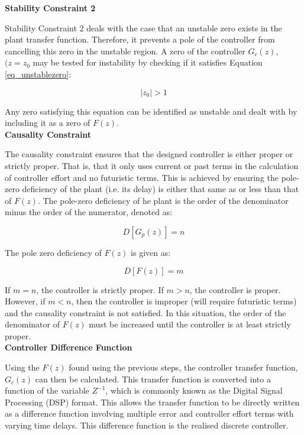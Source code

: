 \textbf{Stability Constraint 2}

Stability Constraint 2 deals with the case that an unstable zero exists in the plant transfer function. Therefore, it prevents a pole of the controller from cancelling this zero in the unstable region. A zero of the controller $G_c(z)$, $(z = z_0$ may be tested for instability by checking if it satisfies Equation \ref{eq_unstablezero}:

\begin{equation}
\label{eq_unstablezero}
|z_0| > 1
\end{equation}

Any zero satisfying this equation can be identified as unstable and dealt with by including it as a zero of $F(z)$.\\

\textbf{Causality Constraint}

The causality constraint ensures that the designed controller is either proper or strictly proper. That is, that it only uses current or past terms in the calculation of controller effort and no futuristic terms. This is achieved by ensuring the pole-zero deficiency of the plant (i.e. its delay) is either that same as or less than that of $F(z)$. The pole-zero deficiency of he plant is the order of the denominator minus the order of the numerator, denoted as:

\begin{equation}
\label{eq_plantdef}
D[ G_p(z) ] = n
\end{equation}

The pole zero deficiency of $F(z)$ is given as:

\begin{equation}
\label{eq_fdef}
D[ F(z) ] = m
\end{equation}

If $m = n$, the controller is strictly proper. If $m > n$, the controller is proper. However, if $m < n$, then the controller is improper (will require futuristic terms) and the causality constraint is not satisfied. In this situation, the order of the denominator of $F(z)$ must be increased until the controller is at least strictly proper.\\

\textbf{Controller Difference Function}

Using the $F(z)$ found using the previous steps, the controller transfer function, $G_c(z)$ can then be calculated. This transfer function is converted into a function of the variable $Z^{-1}$, which is commonly known as the Digital Signal Processing (DSP) format. This allows the transfer function to be directly written as a difference function involving multiple error and controller effort terms with varying time delays. This difference function is the realised discrete controller.\\

